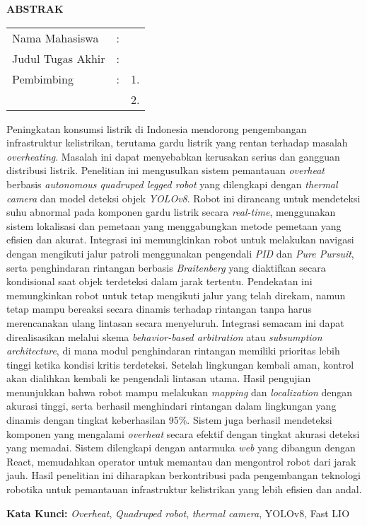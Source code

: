 \begin{center}
  \large\textbf{ABSTRAK}
\end{center}


\vspace{2ex}

\begingroup
\setlength{\tabcolsep}{0pt}

\noindent
\begin{tabularx}{\textwidth}{l >{\centering}m{2em} X}
  Nama Mahasiswa    & : & \name{}         \\

  Judul Tugas Akhir & : & \tatitle{}      \\

  Pembimbing        & : & 1. \advisor{}   \\
                    &   & 2. \coadvisor{} \\
\end{tabularx}
\endgroup

Peningkatan konsumsi listrik di Indonesia mendorong pengembangan infrastruktur kelistrikan, terutama gardu listrik yang rentan terhadap masalah \emph{overheating}. Masalah ini dapat menyebabkan kerusakan serius dan gangguan distribusi listrik. Penelitian ini mengusulkan sistem pemantauan \emph{overheat} berbasis \emph{autonomous quadruped legged robot} yang dilengkapi dengan \emph{thermal camera} dan model deteksi objek \emph{YOLOv8}. Robot ini dirancang untuk mendeteksi suhu abnormal pada komponen gardu listrik secara \emph{real-time}, menggunakan sistem lokalisasi dan pemetaan yang menggabungkan metode pemetaan yang efisien dan akurat. Integrasi ini memungkinkan robot untuk melakukan navigasi dengan mengikuti jalur patroli menggunakan pengendali \emph{PID} dan \emph{Pure Pursuit}, serta penghindaran rintangan berbasis \emph{Braitenberg} yang diaktifkan secara kondisional saat objek terdeteksi dalam jarak tertentu. Pendekatan ini memungkinkan robot untuk tetap mengikuti jalur yang telah direkam, namun tetap mampu bereaksi secara dinamis terhadap rintangan tanpa harus merencanakan ulang lintasan secara menyeluruh. Integrasi semacam ini dapat direalisasikan melalui skema \emph{behavior-based arbitration} atau \emph{subsumption architecture}, di mana modul penghindaran rintangan memiliki prioritas lebih tinggi ketika kondisi kritis terdeteksi. Setelah lingkungan kembali aman, kontrol akan dialihkan kembali ke pengendali lintasan utama. Hasil pengujian menunjukkan bahwa robot mampu melakukan \emph{mapping} dan \emph{localization} dengan akurasi tinggi, serta berhasil menghindari rintangan dalam lingkungan yang dinamis dengan tingkat keberhasilan 95\%. Sistem juga berhasil mendeteksi komponen yang mengalami \emph{overheat} secara efektif dengan tingkat akurasi deteksi yang memadai. Sistem dilengkapi dengan antarmuka \emph{web} yang dibangun dengan React, memudahkan operator untuk memantau dan mengontrol robot dari jarak jauh. Hasil penelitian ini diharapkan berkontribusi pada pengembangan teknologi robotika untuk pemantauan infrastruktur kelistrikan yang lebih efisien dan andal.

\vspace{2ex}
\noindent
\textbf{Kata Kunci:} \emph{Overheat}, \emph{Quadruped robot}, \emph{thermal camera}, YOLOv8, Fast LIO